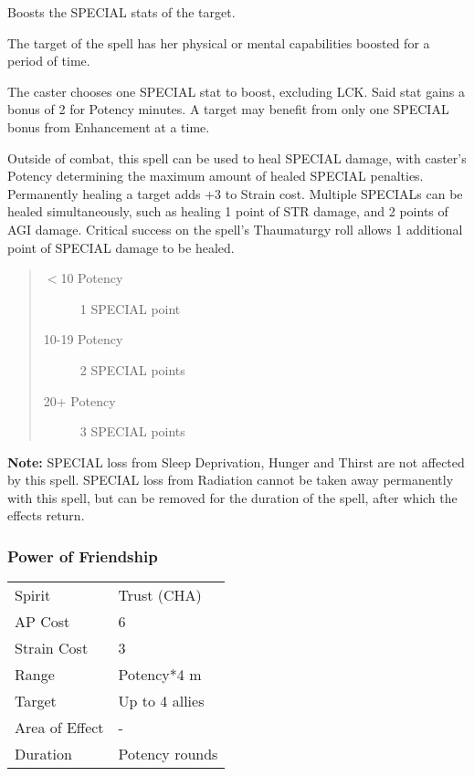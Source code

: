 \documentclass[11pt,a4paper,twocolumn]{book}
\begin{document}
\medskip

Boosts the SPECIAL stats of the target.

The target of the spell has her physical or mental capabilities boosted for a period of time.

The caster chooses one SPECIAL stat to boost, excluding LCK. Said stat gains a bonus of 2 for Potency minutes. A target may benefit from only one SPECIAL bonus from Enhancement at a time.

Outside of combat, this spell can be used to heal SPECIAL damage, with caster's Potency determining the maximum amount of healed SPECIAL penalties. Permanently healing a target adds +3 to Strain cost. Multiple SPECIALs can be healed simultaneously, such as healing 1 point of STR damage, and 2 points of AGI damage. Critical success on the spell's Thaumaturgy roll allows 1 additional point of SPECIAL damage to be healed.

\begin{quote}
	\begin{description}
		\item[$<$10 Potency] 	1 SPECIAL point
		\item[10-19 Potency] 	2 SPECIAL points
		\item[20+ Potency] 		3 SPECIAL points
	\end{description}	
\end{quote}

\textbf{Note:} SPECIAL loss from Sleep Deprivation, Hunger and Thirst are not affected by this spell. SPECIAL loss from Radiation cannot be taken away permanently with this spell, but can be removed for the duration of the spell, after which the effects return.

\subsubsection*{Power of Friendship}
{
	\begin{tabu} to 75mm{| X[l,4] | X[l,7] |}
		\hline
		Spirit         & Trust (CHA)    \\
		AP Cost        & 6              \\
		Strain Cost    & 3              \\
		Range          & Potency*4 m    \\
		Target         & Up to 4 allies \\
		Area of Effect & -              \\
		Duration       & Potency rounds \\ \hline
	\end{tabu}
	
}
\end{document}
